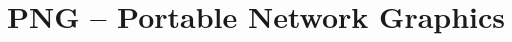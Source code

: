 \begin{comment}
  
\end{comment}

\chapter{PNG -- Portable Network Graphics}
\label{cha:png}

\begin{refsection}

  \printbibliography[heading=subbibliography]

\end{refsection}
